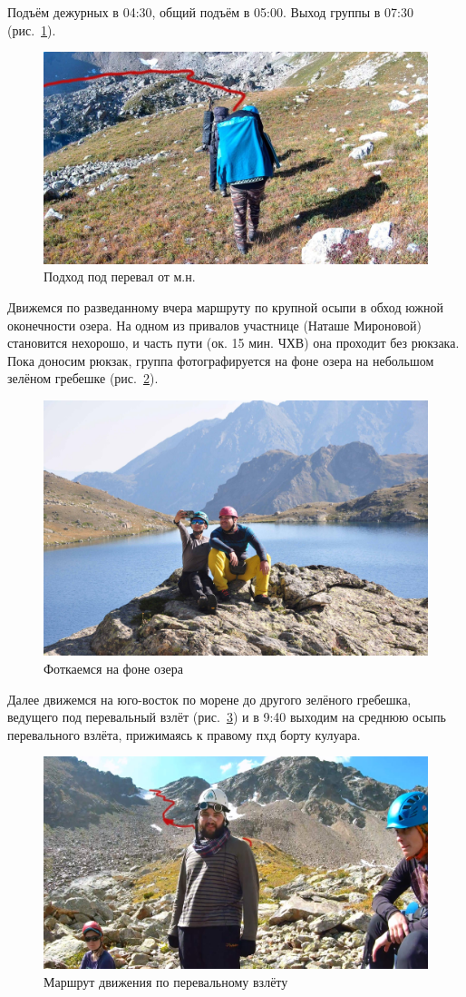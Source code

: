 Подъём дежурных в 04:30, общий подъём в 05:00. Выход группы в 07:30 (рис.~\ref{fig:20aug1.jpg}).

\begin{figure}[h!]
	\centering
	\includegraphics[width=0.7\linewidth]{../pics/20aug1.jpg}
	\caption{Подход под перевал от м.н.}
	\label{fig:20aug1.jpg}
\end{figure}


 Движемся по разведанному вчера маршруту по крупной осыпи в обход южной оконечности озера. На одном из привалов участнице (Наташе Мироновой) становится нехорошо, и часть пути (ок. 15 мин. ЧХВ) она проходит без рюкзака. Пока доносим рюкзак, группа фотографируется на фоне озера на небольшом зелёном гребешке (рис.~\ref{fig:DSC_0907}).
 
 \begin{figure}[h!]
 	\centering
 	\includegraphics[width=0.7\linewidth]{../pics/DSC_0907}
 	\caption{Фоткаемся на фоне озера}
 	\label{fig:DSC_0907}
 \end{figure}
 

Далее движемся на юго-восток по морене до другого зелёного гребешка, ведущего под перевальный взлёт (рис.~\ref{fig:20aug2.jpg}) и в 9:40 выходим на среднюю осыпь перевального взлёта, прижимаясь к правому пхд борту кулуара.

\begin{figure}[h!]
	\centering
	\includegraphics[width=0.7\linewidth]{../pics/20aug2.jpg}
	\caption{Маршрут движения по перевальному взлёту}
	\label{fig:20aug2.jpg}
\end{figure}

